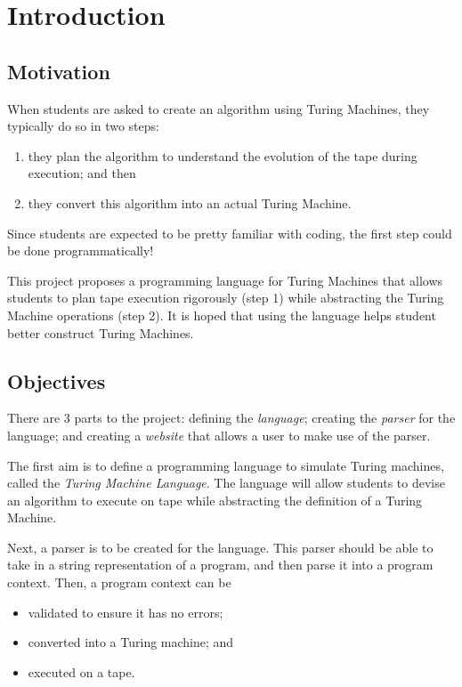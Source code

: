 \chapter{Introduction}


\section{Motivation}
When students are asked to create an algorithm using Turing Machines, they typically do so in two steps:
\begin{enumerate}
    \item they plan the algorithm to understand the evolution of the tape during execution; and then
    \item they convert this algorithm into an actual Turing Machine.
\end{enumerate}
Since students are expected to be pretty familiar with coding, the first step could be done programmatically!

This project proposes a programming language for Turing Machines that allows students to plan tape execution rigorously (step 1) while abstracting the Turing Machine operations (step 2). It is hoped that using the language helps student better construct Turing Machines.

\section{Objectives}
There are 3 parts to the project: defining the \emph{language}; creating the \emph{parser} for the language; and creating a \emph{website} that allows a user to make use of the parser.

The first aim is to define a programming language to simulate Turing machines, called the \emph{Turing Machine Language}. The language will allow students to devise an algorithm to execute on tape while abstracting the definition of a Turing Machine.

Next, a parser is to be created for the language. This parser should be able to take in a string representation of a program, and then parse it into a program context. Then, a program context can be 
\begin{itemize}
    \item validated to ensure it has no errors; 
    \item converted into a Turing machine; and
    \item executed on a tape.
\end{itemize}

